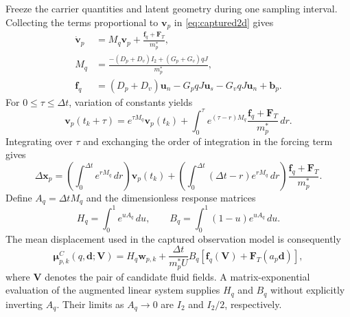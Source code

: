 \documentclass[11pt]{article}
\numberwithin{equation}{section}
\begin{document}
Freeze the carrier quantities and latent geometry during one sampling interval. Collecting the terms proportional to $\mathbf v_p$ in \eqref{eq:captured2d} gives
\begin{equation}
 \begin{aligned}
 \dot{\mathbf v}_p&=M_q\mathbf v_p+
            \frac{\mathbf f_q+\mathbf F_T}{m_p^*},\\
 M_q&=\frac{-(D_p+D_v)I_2+(G_p+G_v)qJ}{m_p^*},\\
 \mathbf f_q&=(D_p+D_v)\mathbf u_n-G_pqJ\mathbf u_s
                  -G_vqJ\mathbf u_n+\mathbf b_p.
 \end{aligned}
 \label{eq:frozenparticle}
\end{equation}
For $0\leq\tau\leq\Delta t$, variation of constants yields
\begin{equation}
 \mathbf v_p(t_k+\tau)=e^{\tau M_q}\mathbf v_p(t_k)
 +\int_0^\tau e^{(\tau-r)M_q}
       \frac{\mathbf f_q+\mathbf F_T}{m_p^*}\,dr.
 \label{eq:variationconstants}
\end{equation}
Integrating over $\tau$ and exchanging the order of integration in the forcing term gives
\begin{equation}
 \Delta\mathbf x_p=
 \left(\int_0^{\Delta t}e^{rM_q}\,dr\right)\mathbf v_p(t_k)
 +\left(\int_0^{\Delta t}(\Delta t-r)e^{rM_q}\,dr\right)
       \frac{\mathbf f_q+\mathbf F_T}{m_p^*}.
 \label{eq:positionintegral}
\end{equation}
Define $A_q=\Delta t M_q$ and the dimensionless response matrices
\begin{equation}
 H_q=\int_0^1e^{uA_q}\,du,
 \qquad B_q=\int_0^1(1-u)e^{uA_q}\,du.
 \label{eq:responsematrices}
\end{equation}
The mean displacement used in the captured observation model is consequently
\begin{equation}
 \bm\mu^C_{p,k}(q,\mathbf d;\mathbf V)=
 H_q\mathbf w_{p,k}
 +\frac{\Delta t}{m_p^*U}B_q
       [\mathbf f_q(\mathbf V)+\mathbf F_T(a_p\mathbf d)],
 \label{eq:captureddecoder}
\end{equation}
where $\mathbf V$ denotes the pair of candidate fluid fields. A matrix-exponential evaluation of the augmented linear system supplies $H_q$ and $B_q$ without explicitly inverting $A_q$. Their limits as $A_q\to0$ are $I_2$ and $I_2/2$, respectively.
\end{document}
